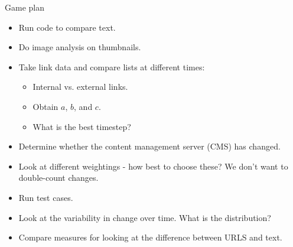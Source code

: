 \documentclass[10pt]{beamer}
\begin{document}
\begin{frame}{Game plan}
\begin{itemize}
\item Run code to compare text.
\item Do image analysis on thumbnails.
\item Take link data and compare lists at different times:
\begin{itemize}
\item Internal vs. external links.
\item Obtain $a$, $b$, and $c$. 
\item What is the best timestep?
\end{itemize}
\item Determine whether the content management server (CMS) has changed.
\item Look at different weightings - how best to choose these? We don't want to double-count changes.
\item Run test cases.
\item Look at the variability in change over time. What is the distribution?
\item Compare measures for looking at the difference between URLS and text.
\end{itemize}

\end{frame}
\end{document}
